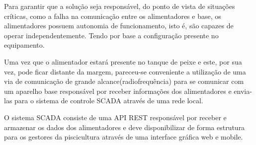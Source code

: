 Para garantir que a solução seja responsável, do ponto de vista de situações críticas, como a falha na comunicação entre os alimentadores e base, os alimentadores possuem autonomia de funcionamento, isto é, são capazes de operar independentemente. Tendo por base a configuração presente no equipamento.

Uma vez que o alimentador estará presente no tanque de peixe e este, por sua vez, pode ficar distante da margem, pareceu-se conveniente a utilização de uma via de comunicação de grande alcance(radiofrequência) para se comunicar com um aparelho base responsável por receber informações dos alimentadores e envia-las para o sistema de controle SCADA através de uma rede local.

O sistema SCADA consiste de uma API REST responsável por receber e armazenar os dados dos alimentadores e deve disponibilizar de forma estrutura para os gestores da piscicultura através de uma interface gráfica web e mobile.
